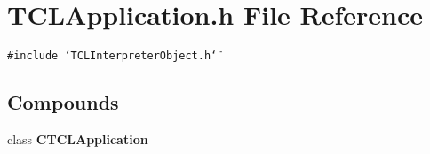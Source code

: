 \section{TCLApplication.h File Reference}
\label{TCLApplication_8h}
{\tt \#include \char`\"{}TCLInterpreter\-Object.h\char`\"{}}\par
\subsection*{Compounds}
\begin{CompactItemize}
\item 
class {\bf CTCLApplication}
\end{CompactItemize}
